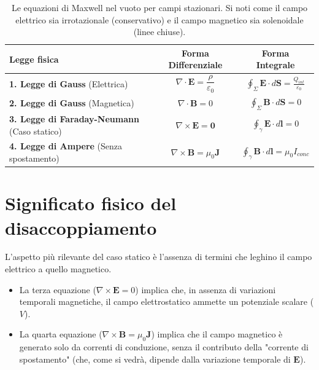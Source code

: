 \documentclass[a4paper,11pt]{report}
\begin{document}
\begin{table}[htbp]
    \centering
    \renewcommand{\arraystretch}{2.2} %
    \begin{tabular}{p{4cm} c c}
        \hline
        \textbf{Legge fisica} & \textbf{Forma Differenziale} & \textbf{Forma Integrale} \\
        \hline
        
        \textbf{1. Legge di Gauss} \newline (Elettrica) & 
        $\nabla \cdot \bm{E} = \dfrac{\rho}{\varepsilon_0}$ & 
        $\displaystyle \oint_{\Sigma} \bm{E} \cdot d\bm{S} = \frac{Q_{int}}{\varepsilon_0}$ \\
        
        \textbf{2. Legge di Gauss} \newline (Magnetica) & 
        $\nabla \cdot \bm{B} = 0$ & 
        $\displaystyle \oint_{\Sigma} \bm{B} \cdot d\bm{S} = 0$ \\
        
        \textbf{3. Legge di Faraday-Neumann} \newline (Caso statico) & 
        $\nabla \times \bm{E} = \bm{0}$ & 
        $\displaystyle \oint_{\gamma} \bm{E} \cdot d\bm{l} = 0$ \\
        
        \textbf{4. Legge di Ampere} \newline (Senza spostamento) & 
        $\nabla \times \bm{B} = \mu_0 \bm{J}$ & 
        $\displaystyle \oint_{\gamma} \bm{B} \cdot d\bm{l} = \mu_0 I_{conc}$ \\
        \hline
    \end{tabular}
    \caption{Le equazioni di Maxwell nel vuoto per campi stazionari. Si noti come il campo elettrico sia irrotazionale (conservativo) e il campo magnetico sia solenoidale (linee chiuse).}
    \label{tab:maxwell_statiche}
\end{table}

\section{Significato fisico del disaccoppiamento}
L'aspetto più rilevante del caso statico è l'assenza di termini che leghino il campo elettrico a quello magnetico.
\begin{itemize}
    \item La terza equazione ($\nabla \times \bm{E} = 0$) implica che, in assenza di variazioni temporali magnetiche, il campo elettrostatico ammette un potenziale scalare ($V$).
    \item La quarta equazione ($\nabla \times \bm{B} = \mu_0 \bm{J}$) implica che il campo magnetico è generato solo da correnti di conduzione, senza il contributo della "corrente di spostamento" (che, come si vedrà, dipende dalla variazione temporale di $\bm{E}$).
\end{itemize}
\end{document}
